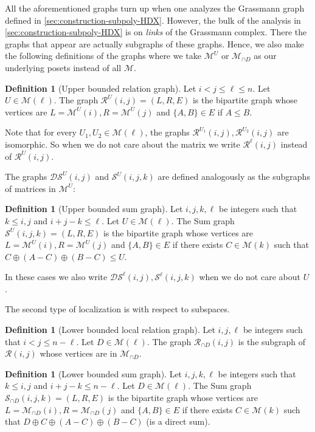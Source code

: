 \documentclass[10pt,a4paper]{article}
\newcommand{\prettyref}[1]{\cref{#1}}
\theoremstyle{definition}
\newtheorem{definition}[theorem]{Definition}
\theoremstyle{remark}
\newcommand{\set}[1]{\{#1\}}
\renewcommand{\leq}{\leqslant}
\numberwithin{equation}{section}
\let\pref=\prettyref
\def\MP{\mathcal{M}}
\begin{document}
All the aforementioned graphs turn up when one analyzes the Grassmann graph defined in \pref{sec:construction-subpoly-HDX}. However, the bulk of the analysis in \pref{sec:construction-subpoly-HDX} is on \emph{links} of the Grassmann complex. There the graphs that appear are actually subgraphs of these graphs. Hence, we also make the following definitions of the graphs where we take \(\MP^{U}\) or \(\MP_{\cap D}\) as our underlying posets instead of all \(\MP\).

\begin{definition}[Upper bounded relation graph]
    Let \(i < j \leq \ell \leq n\). Let \(U \in \MP(\ell)\). The graph \(\mathcal{R}^{U}(i,j) = (L,R,E)\) is the bipartite graph whose vertices are \(L=\MP^{U}(i), R=\MP^{U}(j)\) and \(\set{A,B} \in E\) if \(A \leq B\).
\end{definition}
Note that for every \(U_1,U_2 \in \MP(\ell)\), the graphs \(\mathcal{R}^{U_1}(i,j),\mathcal{R}^{U_2}(i,j)\) are isomorphic. So when we do not care about the matrix we write \(\mathcal{R}^{\ell}(i,j)\) instead of \(\mathcal{R}^{U}(i,j)\). 

The graphs \(\mathcal{DS}^{U}(i,j)\) and \(\mathcal{S}^{U}(i,j,k)\) are defined analogously as the subgraphs of matrices in \(\MP^{U}\):
\begin{definition}[Upper bounded sum graph] \label{def:upper-bounded-sum-graph}
    Let \(i,j,k,\ell\) be integers such that \(k \leq i,j\) and \(i+j-k \leq \ell\). Let \(U \in \MP(\ell)\). The Sum graph \(\mathcal{S}^U(i,j,k) = (L,R,E)\) is the bipartite graph whose vertices are \(L=\MP^U(i), R=\MP^U(j)\) and \(\set{A,B} \in E\) if there exists \(C \in \MP(k)\) such that \(C \oplus (A-C) \oplus (B-C) \leq U\).
\end{definition}
In these cases we also write \(\mathcal{DS}^\ell(i,j), \mathcal{S}^\ell(i,j,k)\) when we do not care about \(U\).

The second type of localization is with respect to subspaces. 

\begin{definition}[Lower bounded local relation graph]
    Let \(i,j,\ell\) be integers such that \(i < j \leq n-\ell\). Let \(D \in \MP(\ell)\). The graph \(\mathcal{R}_{\cap D}(i,j)\) is the subgraph of \(\mathcal{R}(i,j)\) whose vertices are in \(\MP_{\cap D}\).
\end{definition}

\begin{definition}[Lower bounded sum graph]\label{def:lower-bounded-sum-graph}
    Let \(i,j,k,\ell\) be integers such that \(k \leq i,j\) and \(i+j-k \leq n-\ell\). Let \(D \in \MP(\ell)\). The Sum graph \(\mathcal{S}_{\cap D}(i,j,k) = (L,R,E)\) is the bipartite graph whose vertices are \(L=\MP_{\cap D}(i), R=\MP_{\cap D}(j)\) and \(\set{A,B} \in E\) if there exists \(C \in \MP(k)\) such that \(D \oplus C \oplus (A-C) \oplus (B-C)\) (is a direct sum).
\end{definition}
\end{document}
